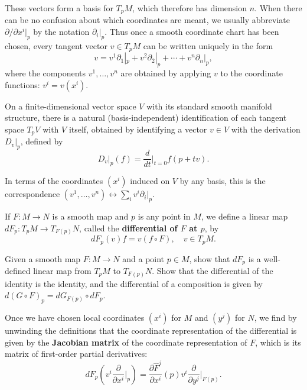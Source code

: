 These vectors form a basis for $T_p M$, which therefore has dimension $n$. When there can be no confusion about which coordinates are meant, we usually abbreviate $\partial/\partial x^i|_p$ by the notation $\partial_i|_p$. Thus once a smooth coordinate chart has been chosen, every tangent vector $v \in T_p M$ can be written uniquely in the form
\begin{equation}
v = v^1 \partial_1|_p + v^2 \partial_2|_p + \cdots + v^n \partial_n|_p,
\tag{A.3}
\end{equation}
where the components $v^1, \ldots, v^n$ are obtained by applying $v$ to the coordinate functions: $v^i = v(x^i)$.

On a finite-dimensional vector space $V$ with its standard smooth manifold structure, there is a natural (basis-independent) identification of each tangent space $T_p V$ with $V$ itself, obtained by identifying a vector $v \in V$ with the derivation $D_v|_p$, defined by
\begin{equation}
D_v|_p(f) = \frac{d}{dt}\bigg|_{t=0} f(p + tv).
\end{equation}

In terms of the coordinates $(x^i)$ induced on $V$ by any basis, this is the correspondence $(v^1, \ldots, v^n) \leftrightarrow \sum_i v^i \partial_i|_p$.

If $F: M \to N$ is a smooth map and $p$ is any point in $M$, we define a linear map $dF_p: T_p M \to T_{F(p)} N$, called the \textbf{differential of $F$ at $p$}, by
\begin{equation}
dF_p(v)f = v(f \circ F), \quad v \in T_p M.
\end{equation}

\begin{exercise}\label{exer:differential-well-defined-functorial}
Given a smooth map $F: M \to N$ and a point $p \in M$, show that $dF_p$ is a well-defined linear map from $T_p M$ to $T_{F(p)} N$. Show that the differential of the identity is the identity, and the differential of a composition is given by $d(G \circ F)_p = dG_{F(p)} \circ dF_p$.
\end{exercise}

Once we have chosen local coordinates $(x^i)$ for $M$ and $(y^j)$ for $N$, we find by unwinding the definitions that the coordinate representation of the differential is given by the \textbf{Jacobian matrix} of the coordinate representation of $F$, which is its matrix of first-order partial derivatives:
\begin{equation}
dF_p\left(v^i \frac{\partial}{\partial x^i}\bigg|_p\right) = \frac{\partial \hat{F}^j}{\partial x^i}(p) v^i \frac{\partial}{\partial y^j}\bigg|_{F(p)}.
\end{equation}

